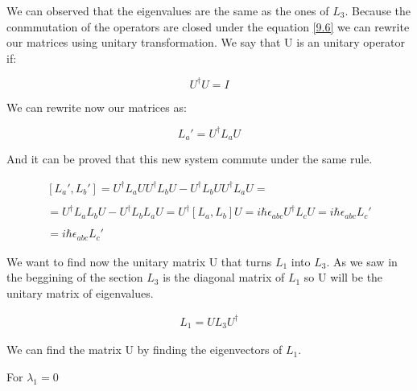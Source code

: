 We can observed that the eigenvalues are the same as the ones of $L_3$. Because the conmmutation of the operators are closed under the equation \ref{9.6} we can rewrite our matrices using unitary transformation. We say that U is an unitary operator if:

\begin{equation}
  U^{\dagger}U = I
\end{equation}

We can rewrite now our matrices as:

\begin{equation}
  L_a' = U^{\dagger} L_a U
\end{equation}

And it can be proved that this new system commute under the same rule.

\begin{equation}
  \begin{array}{c}
    [L_a',L_b'] = U^{\dagger}L_aU U^{\dagger}L_bU - U^{\dagger}L_bU U^{\dagger}L_aU =
    \\

    \\
    = U^{\dagger}L_aL_bU - U^{\dagger}L_bL_aU = U^{\dagger}[L_a,L_b]U = i\hbar \epsilon_{abc} U^{\dagger}L_cU = i\hbar \epsilon_{abc} L_c'\\

    \\
    [L_a',L_b']= i\hbar \epsilon_{abc} L_c'
  \end{array}
\end{equation}

We want to find now the unitary matrix U that turns $L_1$ into $L_3$. As we saw in the beggining of the section $L_3$ is the diagonal matrix of $L_1$ so U will be the unitary matrix of eigenvalues.

\begin{equation}
  \begin{array}{c}
  L_1 = U L_3 U^{\dagger}
  \end{array}
\end{equation}

We can find the matrix U by finding the eigenvectors of $L_1$.

For $\lambda_1 = 0$

